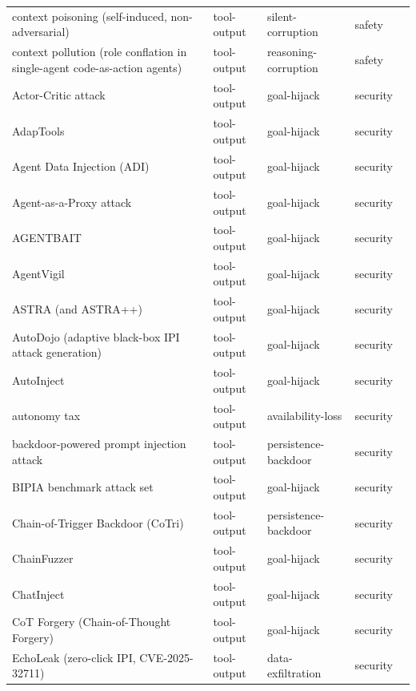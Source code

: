 \begin{longtable}{@{}p{}llll@{}}
context poisoning (self-induced, non-adversarial) & tool-output & silent-corruption & safety & \cite{chen-2026-unlocking} \\
context pollution (role conflation in single-agent code-as-action agents) & tool-output & reasoning-corruption & safety & \cite{fei-2026-codedelegator} \\
Actor-Critic attack & tool-output & goal-hijack & security & \cite{shi-2025-lessons} \\
AdapTools & tool-output & goal-hijack & security & \cite{wang-2026-adaptools} \\
Agent Data Injection (ADI) & tool-output & goal-hijack & security & \cite{choi-2026-agent} \\
Agent-as-a-Proxy attack & tool-output & goal-hijack & security & \cite{isbarov-2026-bypassing} \\
AGENTBAIT & tool-output & goal-hijack & security & \cite{wu-2026-bots} \\
AgentVigil & tool-output & goal-hijack & security & \cite{wang-2025-agentvigilb} \\
ASTRA (and ASTRA++) & tool-output & goal-hijack & security & \cite{pandya-2025-may} \\
AutoDojo (adaptive black-box IPI attack generation) & tool-output & goal-hijack & security & \cite{ma-2026-autodojo} \\
AutoInject & tool-output & goal-hijack & security & \cite{chen-2026-learning} \\
autonomy tax & tool-output & availability-loss & security & \cite{li-2026-autonomy} \\
backdoor-powered prompt injection attack & tool-output & persistence-backdoor & security & \cite{chen-2025-backdoorpowered} \\
BIPIA benchmark attack set & tool-output & goal-hijack & security & \cite{yi-2023-benchmarking} \\
Chain-of-Trigger Backdoor (CoTri) & tool-output & persistence-backdoor & security & \cite{qiu-2025-chainoftrigger} \\
ChainFuzzer & tool-output & goal-hijack & security & \cite{wu-2026-chainfuzzer} \\
ChatInject & tool-output & goal-hijack & security & \cite{chang-2025-chatinject} \\
CoT Forgery (Chain-of-Thought Forgery) & tool-output & goal-hijack & security & \cite{ye-2026-prompt} \\
EchoLeak (zero-click IPI, CVE-2025-32711) & tool-output & data-exfiltration & security & \cite{reddy-2025-echoleak} \\

\end{longtable}
